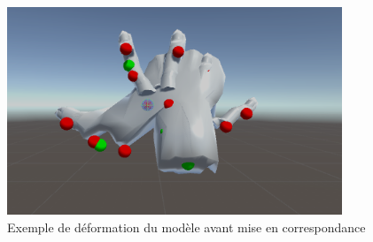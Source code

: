 \begin{figure}
\label{fig:badhand}
\centering
\includegraphics[width=10cm]{images/BadHand.png}
\caption{Exemple de déformation du modèle avant mise en correspondance}	
\end{figure}


